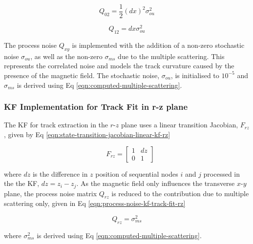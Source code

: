 \begin{equation}
Q_{02} = \frac{1}{2} (dx)^2 \sigma_{ou}^{2}
\label{eqn:q02}
\end{equation}

\begin{equation}
Q_{12} = dx \sigma_{ou}^{2}
\label{eqn:q12}
\end{equation}

The process noise $Q_{xy}$ is implemented with the addition of a non-zero stochastic noise $\sigma_{ou}$, as well as the non-zero $\sigma_{ms}$ due to the multiple scattering. This represents the correlated noise and models the track curvature caused by the presence of the magnetic field. The stochastic noise, $\sigma_{ou}$, is initialised to $10^{-5}$ and $\sigma_{ms}$ is derived using Eq \eqref{eqn:computed-multiple-scattering}.





\subsubsection{KF Implementation for Track Fit in r-z plane}

The KF for track extraction in the $r$-$z$ plane uses a linear transition Jacobian, $F_{rz}$, given by Eq \eqref{eqn:state-transition-jacobian-linear-kf-rz}

\begin{equation}
\quad F_{rz} = \begin{bmatrix} 1 & dz \\ 0 & 1 \end{bmatrix} 
\label{eqn:state-transition-jacobian-linear-kf-rz}
\end{equation}

where $dz$ is the difference in $z$ position of sequential nodes $i$ and $j$ processed in the the KF, $dz = z_i - z_j$. As the magnetic field only influences the transverse $x$-$y$ plane, the process noise matrix $Q_{rz}$ is reduced to the contribution due to multiple scattering only, given in Eq \eqref{eqn:process-noise-kf-track-fit-rz}

\begin{equation}
Q_{rz} = \sigma_{ms}^{2}
\label{eqn:process-noise-kf-track-fit-rz}
\end{equation}

where $\sigma_{ms}^{2}$ is derived using Eq \eqref{eqn:computed-multiple-scattering}.





